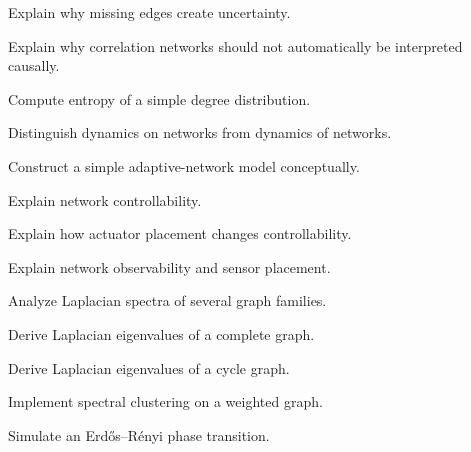 \begin{exercise}[3]
Explain why missing edges create uncertainty.
\end{exercise}

\begin{exercise}[3]
Explain why correlation networks should not automatically be interpreted
causally.
\end{exercise}

\begin{exercise}[2]
Compute entropy of a simple degree distribution.
\end{exercise}

\begin{exercise}[3]
Distinguish dynamics on networks from dynamics of networks.
\end{exercise}

\begin{exercise}[3]
Construct a simple adaptive-network model conceptually.
\end{exercise}

\begin{exercise}[3]
Explain network controllability.
\end{exercise}

\begin{exercise}[3]
Explain how actuator placement changes controllability.
\end{exercise}

\begin{exercise}[3]
Explain network observability and sensor placement.
\end{exercise}

\begin{exercise}[4]
Analyze Laplacian spectra of several graph families.
\end{exercise}

\begin{exercise}[4]
Derive Laplacian eigenvalues of a complete graph.
\end{exercise}

\begin{exercise}[4]
Derive Laplacian eigenvalues of a cycle graph.
\end{exercise}

\begin{exercise}[4]
Implement spectral clustering on a weighted graph.
\end{exercise}

\begin{exercise}[4]
Simulate an Erdős--Rényi phase transition.
\end{exercise}

